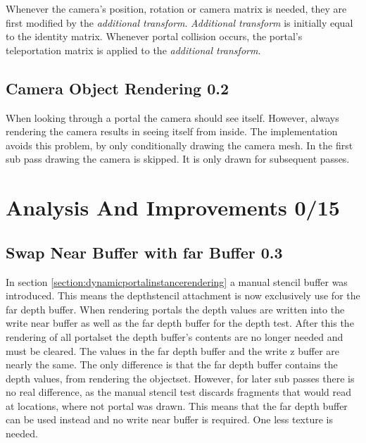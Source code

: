 Whenever the camera's position, rotation or camera matrix is needed, they are first modified by the \textit{additional transform}. \textit{Additional transform} is initially equal to the identity matrix. Whenever portal collision occurs, the portal's teleportation matrix is applied to the \textit{additional transform}.



\subsection{Camera Object Rendering 0.2}
When looking through a portal the camera should see itself. However, always rendering the camera results in seeing itself from inside. The implementation avoids this problem, by only conditionally drawing the camera mesh. In the first sub pass drawing the camera is skipped. It is only drawn for subsequent passes.




\section{Analysis And Improvements 0/15}

\subsection{Swap Near Buffer with far Buffer 0.3}

In section \ref{section:dynamicportalinstancerendering} a manual stencil buffer was introduced. This means the depthstencil attachment is now exclusively use for the far depth buffer. When rendering portals the depth values are written into the write near buffer as well as the far depth buffer for the depth test. After this the rendering of all \gls{portalset} the depth buffer's contents are no longer needed and must be cleared. The values in the far depth buffer and the write z buffer are nearly the same. The only difference is that the far depth buffer contains the depth values, from rendering the \gls{objectset}. However, for later sub passes there is no real difference, as the manual stencil test discards fragments that would read at locations, where not portal was drawn. This means that the far depth buffer can be used instead and no write near buffer is required. One less texture is needed.



